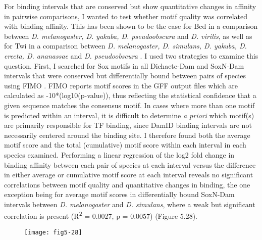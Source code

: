 For binding intervals that are conserved but show quantitative changes in affinity in pairwise comparisons, I wanted to test whether motif quality was correlated with binding affinity. This has been shown to be the case for Bcd in a comparison between \emph{D. melanogaster, D. yakuba, D. pseudoobscura} and \emph{D. virilis}, as well as for Twi in a comparison between \emph{D. melanogaster, D. simulans, D. yakuba, D. erecta, D. ananassae} and \emph{D. pseudoobscura} \citep{he_high_2011,paris_extensive_2013}. I used two strategies to examine this question. First, I searched for Sox motifs in all Dichaete-Dam and SoxN-Dam intervals that were conserved but differentially bound between pairs of species using FIMO \citep{grant_fimo:_2011}. FIMO reports motif scores in the GFF output files which are calculated as -10*(log10(p-value)), thus reflecting the statistical confidence that a given sequence matches the consensus motif. In cases where more than one motif is predicted within an interval, it is difficult to determine \emph{a priori} which motif(s) are primarily responsible for TF binding, since DamID binding intervals are not necessarily centered around the binding site. I therefore found both the average motif score and the total (cumulative) motif score within each interval in each species examined. Performing a linear regression of the log2 fold change in binding affinity between each pair of species at each interval versus the difference in either average or cumulative motif score at each interval reveals no significant correlations between motif quality and quantitative changes in binding, the one exception being for average motif scores in differentially bound SoxN-Dam intervals between \emph{D. melanogaster} and \emph{D. simulans}, where a weak but significant correlation is present (R\textsuperscript{2} = 0.0027, p = 0.0057) (Figure 5.28).\\

\begin{figure}[H]
\centering
\texttt{[image: fig5-28]}
\label{Figure 5.28}
\end{figure}


